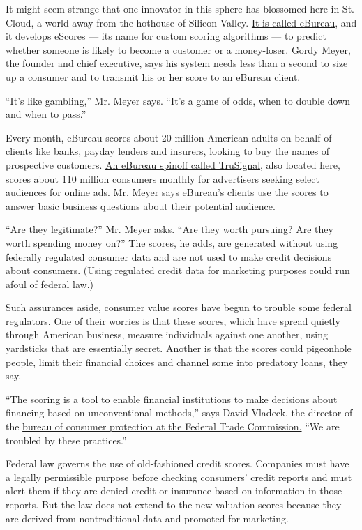 It might seem strange that one innovator in this sphere has blossomed
here in St. Cloud, a world away from the hothouse of Silicon Valley.
\href{http://www.ebureau.com/}{It is called eBureau,} and it develops
eScores --- its name for custom scoring algorithms --- to predict
whether someone is likely to become a customer or a money-loser. Gordy
Meyer, the founder and chief executive, says his system needs less than
a second to size up a consumer and to transmit his or her score to an
eBureau client.

``It's like gambling,'' Mr. Meyer says. ``It's a game of odds, when to
double down and when to pass.''

Every month, eBureau scores about 20 million American adults on behalf
of clients like banks, payday lenders and insurers, looking to buy the
names of prospective customers. \href{http://www.tru-signal.com/}{An
eBureau spinoff called TruSignal}, also located here, scores about 110
million consumers monthly for advertisers seeking select audiences for
online ads. Mr. Meyer says eBureau's clients use the scores to answer
basic business questions about their potential audience.

``Are they legitimate?'' Mr. Meyer asks. ``Are they worth pursuing? Are
they worth spending money on?'' The scores, he adds, are generated
without using federally regulated consumer data and are not used to make
credit decisions about consumers. (Using regulated credit data for
marketing purposes could run afoul of federal law.)

Such assurances aside, consumer value scores have begun to trouble some
federal regulators. One of their worries is that these scores, which
have spread quietly through American business, measure individuals
against one another, using yardsticks that are essentially secret.
Another is that the scores could pigeonhole people, limit their
financial choices and channel some into predatory loans, they say.

``The scoring is a tool to enable financial institutions to make
decisions about financing based on unconventional methods,'' says David
Vladeck, the director of the
\href{http://www.ftc.gov/bcp/index.shtml}{bureau of consumer protection
at the Federal Trade Commission.} ``We are troubled by these
practices.''

Federal law governs the use of old-fashioned credit scores. Companies
must have a legally permissible purpose before checking consumers'
credit reports and must alert them if they are denied credit or
insurance based on information in those reports. But the law does not
extend to the new valuation scores because they are derived from
nontraditional data and promoted for marketing.

